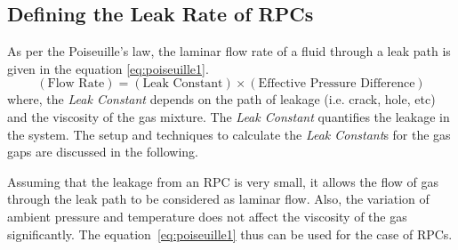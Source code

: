 \subsection{Defining the Leak Rate of RPCs}
As per the Poiseuille's law\cite{poiseuille}, the laminar flow rate of a fluid
through a leak path is given in the equation \ref{eq:poiseuille1}.
\begin{equation}
\left(\text{Flow Rate}\right)=\left(\text{Leak Constant}\right)\times\left(\text{Effective Pressure Difference}\right)\label{eq:poiseuille1}
\end{equation}
where, the \textit{Leak Constant} depends on the path of leakage (i.e. crack,
hole, etc) and the viscosity of the gas mixture. The \textit{Leak Constant}
quantifies the leakage in the system. The setup and techniques to calculate
the \textit{Leak Constant}s for the gas gaps are discussed in the following.

Assuming that the leakage from an RPC is very small, it allows the flow of gas
through the leak path to be considered as laminar flow. Also, the variation of
ambient pressure and temperature does not affect the viscosity of the gas
significantly. The equation~\ref{eq:poiseuille1} thus can be used for the case
of RPCs.

